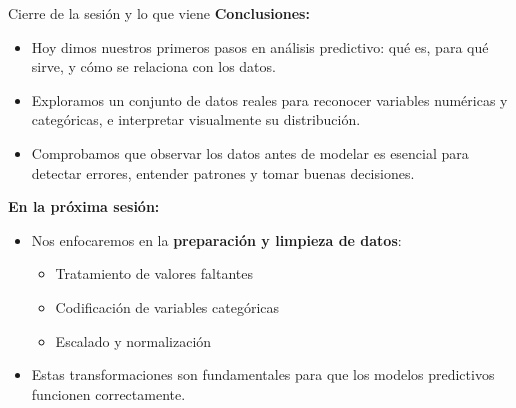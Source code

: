 \documentclass{beamer}
\begin{document}
\begin{frame}{Cierre de la sesión y lo que viene}
	\textbf{Conclusiones:}
	\begin{itemize}
		\item Hoy dimos nuestros primeros pasos en análisis predictivo: qué es, para qué sirve, y cómo se relaciona con los datos.
		\item Exploramos un conjunto de datos reales para reconocer variables numéricas y categóricas, e interpretar visualmente su distribución.
		\item Comprobamos que observar los datos antes de modelar es esencial para detectar errores, entender patrones y tomar buenas decisiones.
	\end{itemize}
	
	\vspace{0.3cm}
	\textbf{En la próxima sesión:}
	\begin{itemize}
		\item Nos enfocaremos en la \textbf{preparación y limpieza de datos}:
		\begin{itemize}
			\item Tratamiento de valores faltantes
			\item Codificación de variables categóricas
			\item Escalado y normalización
		\end{itemize}
		\item Estas transformaciones son fundamentales para que los modelos predictivos funcionen correctamente.
	\end{itemize}
\end{frame}
\end{document}
